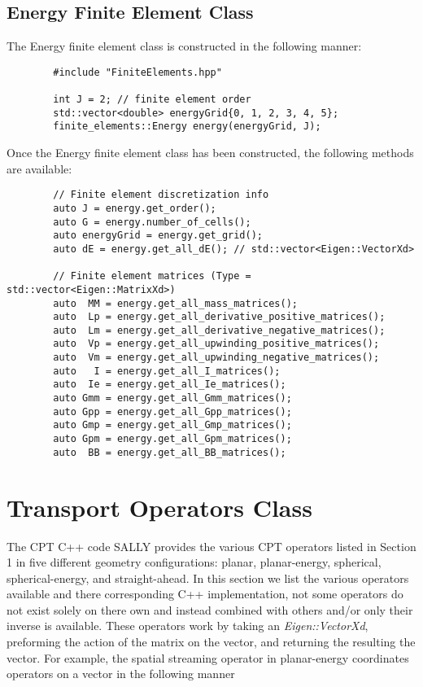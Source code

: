 \documentclass[../main.tex]{subfiles}
\begin{document}
    \subsection{Energy Finite Element Class}
    The Energy finite element class is constructed in the following manner:
    \begin{verbatim}
        #include "FiniteElements.hpp"
        
        int J = 2; // finite element order
        std::vector<double> energyGrid{0, 1, 2, 3, 4, 5};
        finite_elements::Energy energy(energyGrid, J);
    \end{verbatim}
    Once the Energy finite element class has been constructed, the following methods are available:
    \begin{verbatim}
        // Finite element discretization info
        auto J = energy.get_order();
        auto G = energy.number_of_cells();
        auto energyGrid = energy.get_grid();
        auto dE = energy.get_all_dE(); // std::vector<Eigen::VectorXd>
        
        // Finite element matrices (Type = std::vector<Eigen::MatrixXd>)
        auto  MM = energy.get_all_mass_matrices();
        auto  Lp = energy.get_all_derivative_positive_matrices();
        auto  Lm = energy.get_all_derivative_negative_matrices();
        auto  Vp = energy.get_all_upwinding_positive_matrices();
        auto  Vm = energy.get_all_upwinding_negative_matrices();
        auto   I = energy.get_all_I_matrices();
        auto  Ie = energy.get_all_Ie_matrices();
        auto Gmm = energy.get_all_Gmm_matrices();
        auto Gpp = energy.get_all_Gpp_matrices();
        auto Gmp = energy.get_all_Gmp_matrices();
        auto Gpm = energy.get_all_Gpm_matrices();
        auto  BB = energy.get_all_BB_matrices();
    \end{verbatim}

\section{Transport Operators Class}
The CPT C++ code SALLY provides the various CPT operators listed in Section 1 in five different geometry configurations: planar, planar-energy, spherical, spherical-energy, and straight-ahead. In this section we list the various operators available and there corresponding C++ implementation, not some operators do not exist solely on there own and instead combined with others and/or only their inverse is available. These operators work by taking an \emph{Eigen::VectorXd}, preforming the action of the matrix on the vector, and returning the resulting the vector. For example, the spatial streaming operator in planar-energy coordinates operators on a vector in the following manner
    
\end{document}
